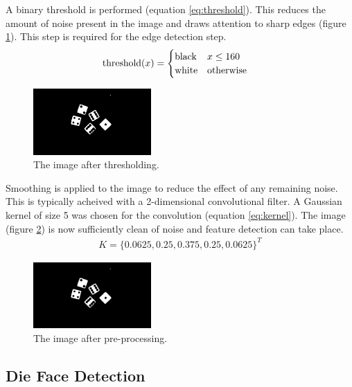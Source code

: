 \documentclass[conference]{IEEEtran}
\begin{document}
A binary threshold is performed (equation \ref{eq:threshold}).
This reduces the amount of noise present in the image and draws attention to sharp edges (figure \ref{fig:threshold}).
This step is required for the edge detection step.
\begin{align}
	\textnormal{threshold}(x) &= \begin{cases}
		\textnormal{black} & x \leq 160 \\
		\textnormal{white} & \textnormal{otherwise}
	\end{cases} \label{eq:threshold}
\end{align}
\begin{figure}
	\centering
	\includegraphics[width=0.4\textwidth]{threshold}
	\caption{The image after thresholding.}
	\label{fig:threshold}
\end{figure}

Smoothing is applied to the image to reduce the effect of any remaining noise.
This is typically acheived with a 2-dimensional convolutional filter.
A Gaussian kernel of size 5 was chosen for the convolution (equation \ref{eq:kernel}). 
The image (figure \ref{fig:blurred}) is now sufficiently clean of noise and feature detection can take place.
\begin{align}
	K = \{0.0625, 0.25, 0.375, 0.25, 0.0625\}^T \label{eq:kernel}
\end{align}
\begin{figure}
	\centering
	\includegraphics[width=0.4\textwidth]{blur}
	\caption{The image after pre-processing.}
	\label{fig:blurred}
\end{figure}

\subsection{Die Face Detection}
\end{document}
